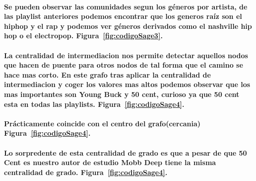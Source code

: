 \documentclass[11pt,spanish]{article}
\begin{document}
\paragraph*{Se pueden observar las comunidades segun los géneros por artista, 
de las playlist anteriores podemos encontrar que los generos raíz son el hiphop y el rap
y podemos ver géneros derivados como el nashville hip hop o el electropop. Figura~\ref{fig:codigoSage3}.}

\paragraph*{La centralidad de intermediacion nos permite detectar 
aquellos nodos que hacen de puente para otros nodos de tal forma que el camino se hace mas corto.
En este grafo tras aplicar la centralidad de intermediacion y coger los valores mas altos 
podemos observar que los mas importantes son Young Buck y 50 cent, 
curioso ya que 50 cent esta en todas las playlists. Figura~\ref{fig:codigoSage4}.}

\paragraph*{Prácticamente coincide con el centro del grafo(cercania) Figura~\ref{fig:codigoSage4}.}

\paragraph*{Lo sorpredente de esta centralidad de grado es que a pesar de que 50 Cent es nuestro 
autor de estudio Mobb Deep tiene la misma centralidad de grado. Figura~\ref{fig:codigoSage4}.}
\end{document}
